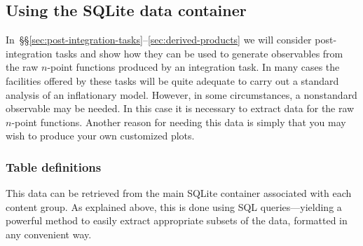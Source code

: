\documentclass[11pt,a4paper]{article}
\renewcommand{\texttt}[1]{{\ttfamily\fontseries{l}\selectfont{#1}}}
\newcommand{\packagefont}{\sffamily}
\newcommand{\SQLite}{{\packagefont SQLite}}
\newcommand{\file}[1]{\texttt{{#1}}}
\begin{document}
\subsection{Using the {\SQLite} data container}
\label{sec:using-integration-container}
In~\S\S\ref{sec:post-integration-tasks}--\ref{sec:derived-products}
we will consider post-integration tasks and show how they can be used
to generate observables from the raw $n$-point functions produced by
an integration task.
In many cases the facilities offered by these
tasks will be quite adequate to carry out a
standard analysis of an inflationary model.
However, in some circumstances, a nonstandard observable may be
needed.
In this case it is necessary to extract data for the raw $n$-point functions.
Another reason for needing this data is simply that you may
wish to produce your own customized plots.

\subsubsection{Table definitions}
This data can be retrieved from the main {\SQLite} container
\file{data.sqlite}
associated with each content group.
As explained above, this is done using SQL queries---yielding
a powerful method to easily extract appropriate subsets
of the data, formatted in any convenient way.
\end{document}
